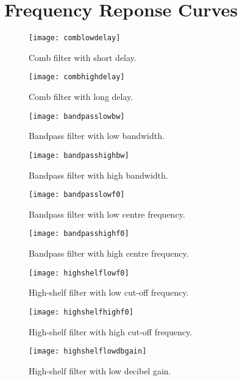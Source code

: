 \chapter{Frequency Reponse Curves}\label{ch:appB}

\begin{figure}[!h] 
\centering
\texttt{[image: comblowdelay]}
\caption{\label{fig:comblowdelay} Comb filter with short delay.}
\end{figure}

\begin{figure}[!h] 
\centering
\texttt{[image: combhighdelay]}
\caption{\label{fig:combhighdelay} Comb filter with long delay.}
\end{figure}

\begin{figure}[!h] 
\centering
\texttt{[image: bandpasslowbw]}
\caption{\label{fig:bandpasslowbw} Bandpass filter with low bandwidth.}
\end{figure}

\begin{figure}[!h] 
\centering
\texttt{[image: bandpasshighbw]}
\caption{\label{fig:bandpasshighbw} Bandpass filter with high bandwidth.}
\end{figure}

\begin{figure}[!h] 
\centering
\texttt{[image: bandpasslowf0]}
\caption{\label{fig:bandpasslowf0} Bandpass filter with low centre frequency.}
\end{figure}

\begin{figure}[!h] 
\centering
\texttt{[image: bandpasshighf0]}
\caption{\label{fig:bandpasshighf0} Bandpass filter with high centre frequency.}
\end{figure}

\begin{figure}[!h] 
\centering
\texttt{[image: highshelflowf0]}
\caption{\label{fig:highshelflowf0} High-shelf filter with low cut-off frequency.}
\end{figure}

\begin{figure}[!h] 
\centering
\texttt{[image: highshelfhighf0]}
\caption{\label{fig:highshelhighf0} High-shelf filter with high cut-off frequency.}
\end{figure}

\begin{figure}[!h] 
\centering
\texttt{[image: highshelflowdbgain]}
\caption{\label{fig:highshelflowdbgain} High-shelf filter with low decibel gain.}
\end{figure}

